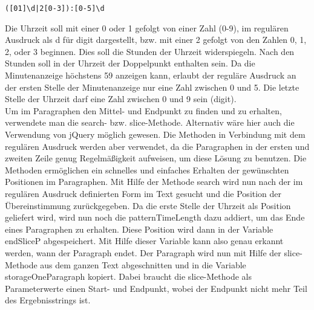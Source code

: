 {\begin{verbatim}
([01]\d|2[0-3]):[0-5]\d
\end{verbatim}
Die Uhrzeit soll mit einer 0 oder 1 gefolgt von einer Zahl (0-9), im regulären Ausdruck als d für digit dargestellt, bzw. mit einer 2 gefolgt von den Zahlen 0, 1, 2, oder 3 beginnen. Dies soll die Stunden der Uhrzeit widerspiegeln. Nach den Stunden soll in der Uhrzeit der Doppelpunkt enthalten sein. Da die Minutenanzeige höchstens 59 anzeigen kann, erlaubt der reguläre Ausdruck an der ersten Stelle der Minutenanzeige nur eine Zahl zwischen 0 und 5. Die letzte Stelle der Uhrzeit darf eine Zahl zwischen 0 und 9 sein (digit). \\
Um im Paragraphen den Mittel- und Endpunkt zu finden und zu erhalten, verwendete man die search- bzw. slice-Methode. Alternativ wäre hier auch die Verwendung von jQuery möglich gewesen. Die Methoden in Verbindung mit dem regulären Ausdruck werden aber verwendet, da die Paragraphen in der ersten und zweiten Zeile genug Regelmäßigkeit aufweisen, um diese Lösung zu benutzen. Die Methoden ermöglichen ein schnelles und einfaches Erhalten der gewünschten Positionen im Paragraphen.
Mit Hilfe der Methode search wird nun nach der im regulären Ausdruck definierten Form im Text gesucht und die Position der Übereinstimmung zurückgegeben. Da die erste Stelle der Uhrzeit als Position geliefert wird, wird nun noch die patternTimeLength dazu addiert, um das Ende eines Paragraphen zu erhalten. Diese Position wird dann in der Variable endSliceP abgespeichert. Mit Hilfe dieser Variable kann also genau erkannt werden, wann der Paragraph endet. Der Paragraph wird nun mit Hilfe der slice-Methode aus dem ganzen Text abgeschnitten und in die Variable storageOneParagraph kopiert. Dabei braucht die slice-Methode als Parameterwerte einen Start- und Endpunkt, wobei der Endpunkt nicht mehr Teil des Ergebnisstrings ist. 

}
